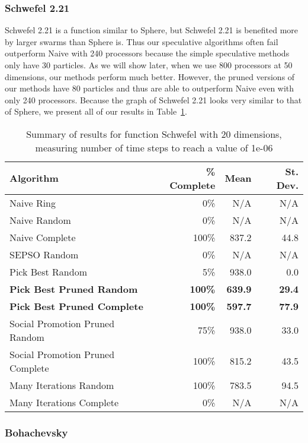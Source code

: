 \documentclass[smallcondensed]{svjour3}
\newcommand{\tabref}[1]{Table~\ref{tab:#1}}
\begin{document}
\subsubsection{Schwefel 2.21}

Schwefel 2.21 is a function similar to Sphere, but Schwefel 2.21 is benefited
more by larger swarms than Sphere is.  Thus our speculative algorithms often
fail outperform Naive with 240 processors because the simple speculative
methods only have 30 particles.  As we will show later, when we use 800
processors at 50 dimensions, our methods perform much better.  However, the
pruned versions of our methods have 80 particles and thus are able to
outperform Naive even with only 240 processors.  Because the graph of Schwefel
2.21 looks very similar to that of Sphere, we present all of our results in
\tabref{schwefel-20}.

\begin{table}
  \caption{Summary of results for function Schwefel with 20 dimensions,
  measuring number of time steps to reach a value of 1e-06}
  \label{tab:schwefel-20}
  \centering
  \begin{tabular}{|l|r|r|r|}
  \hline
  Algorithm&\% Complete&Mean&St. Dev.\\
  \hline
  \hline
  Naive Ring&0\%&N/A&N/A\\
  \hline
  Naive Random&0\%&N/A&N/A\\
  \hline
  Naive Complete&100\%&837.2&44.8\\
  \hline
  SEPSO Random&0\%&N/A&N/A\\
  \hline
  Pick Best Random&5\%&938.0&0.0\\
  \hline
  \textbf{Pick Best Pruned Random}&\textbf{100\%}&\textbf{639.9}&\textbf{29.4}\\
  \hline
  \textbf{Pick Best Pruned Complete}&\textbf{100\%}&\textbf{597.7}&
	\textbf{77.9}\\
  \hline
  Social Promotion Pruned Random&75\%&938.0&33.0\\
  \hline
  Social Promotion Pruned Complete&100\%&815.2&43.5\\
  \hline
  Many Iterations Random&100\%&783.5&94.5\\
  \hline
  Many Iterations Complete&0\%&N/A&N/A\\
  \hline
  \end{tabular}
\end{table}


\subsubsection{Bohachevsky}
\end{document}
